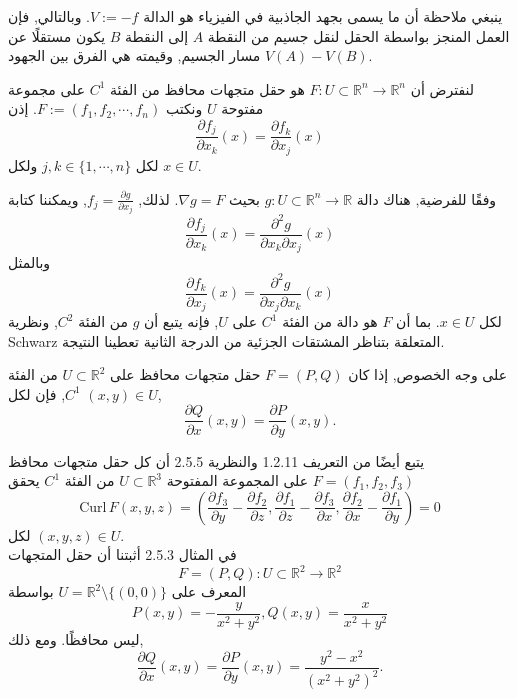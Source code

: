 ينبغي ملاحظة أن ما يسمى بجهد الجاذبية في الفيزياء هو الدالة \( V := -f \). وبالتالي, فإن العمل المنجز بواسطة الحقل لنقل جسيم من النقطة \( A \) إلى النقطة \( B \) يكون مستقلًا عن مسار الجسيم, وقيمته هي الفرق بين الجهود \( V(A) - V(B) \).

\begin{theoreme}
لنفترض أن \( F : U \subset \mathbb{R}^n \to \mathbb{R}^n \) هو حقل متجهات محافظ من الفئة \( C^1 \) على مجموعة مفتوحة \( U \) ونكتب \( F := (f_1, f_2, \cdots, f_n) \). إذن
\[ \frac{\partial f_j}{\partial x_k} (x) = \frac{\partial f_k}{\partial x_j} (x) \]
لكل \( j, k \in \{1, \cdots, n\} \) ولكل \( x \in U \).
\end{theoreme}

\begin{demonstration}
   
وفقًا للفرضية, هناك دالة \( g : U \subset \mathbb{R}^n \to \mathbb{R} \) بحيث \( \nabla g = F \). لذلك, \( f_j = \frac{\partial g}{\partial x_j} \), ويمكننا كتابة
\[ \frac{\partial f_j}{\partial x_k} (x) = \frac{\partial^2 g}{\partial x_k \partial x_j} (x) \]
وبالمثل
\[ \frac{\partial f_k}{\partial x_j} (x) = \frac{\partial^2 g}{\partial x_j \partial x_k} (x) \]
لكل \( x \in U \). بما أن \( F \) هو دالة من الفئة \( C^1 \) على \( U \), فإنه يتبع أن \( g \) من الفئة \( C^2 \), ونظرية Schwarz المتعلقة بتناظر المشتقات الجزئية من الدرجة الثانية تعطينا النتيجة.
\end{demonstration}

على وجه الخصوص, إذا كان \( F = (P, Q) \) حقل متجهات محافظ على \( U \subset \mathbb{R}^2 \) من الفئة \( C^1 \), فإن لكل \( (x, y) \in U \),
\[ \frac{\partial Q}{\partial x} (x, y) = \frac{\partial P}{\partial y} (x, y). \]

يتبع أيضًا من التعريف 1.2.11 والنظرية 2.5.5 أن كل حقل متجهات محافظ \( F = (f_1, f_2, f_3) \) على المجموعة المفتوحة \( U \subset \mathbb{R}^3 \) من الفئة \( C^1 \) يحقق
\[ \text{Curl} \, F (x, y, z) = \left( \frac{\partial f_3}{\partial y} - \frac{\partial f_2}{\partial z}, \frac{\partial f_1}{\partial z} - \frac{\partial f_3}{\partial x}, \frac{\partial f_2}{\partial x} - \frac{\partial f_1}{\partial y} \right) = 0 \]
لكل \( (x, y, z) \in U \).
\\
في المثال 2.5.3 أثبتنا أن حقل المتجهات
\[ F = (P, Q) : U \subset \mathbb{R}^2 \to \mathbb{R}^2 \]
المعرف على \( U = \mathbb{R}^2 \setminus \{(0, 0)\} \) بواسطة
\[ P(x, y) = - \frac{y}{x^2 + y^2}, Q(x, y) = \frac{x}{x^2 + y^2} \]
ليس محافظًا. ومع ذلك,
\[ \frac{\partial Q}{\partial x} (x, y) = \frac{\partial P}{\partial y} (x, y) = \frac{y^2 - x^2}{(x^2 + y^2)^2}. \]


